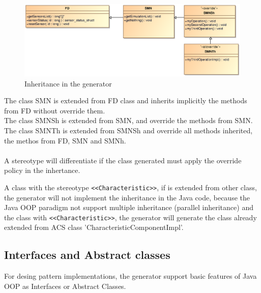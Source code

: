 \begin{figure}[h!t]
\begin{center}
\includegraphics[scale=0.75]{images/simpleinheritance}
\caption{\label{fig:vs_diag}Inheritance in the generator}
\end{center}
\end{figure}

The class SMN is extended from FD class and inherits implicitly the methods
from FD without override them.\\ 
The class SMNSh is extended from SMN, and override the methods from SMN.\\
The class SMNTh is extended from SMNSh and override all methods inherited, the
methos from FD, SMN and SMNh.\\
\\
A stereotype will differentiate if the class generated must apply the override
policy in the inhertance.

A class with the stereotype \verb+<<Characteristic>>+, if is extended from
other class, the generator will not implement the inheritance in the Java code,
because the Java OOP paradigm not support multiple inheritance (parallel
inheritance) and the class with \verb+<<Characteristic>>+, the generator will
generate the class already extended from ACS class 'CharacteristicComponentImpl'.
 


\newpage

\subsection{Interfaces and Abstract classes}
For desing pattern implementations, the generator support basic features of
Java OOP as Interfaces or Abstract Classes.
